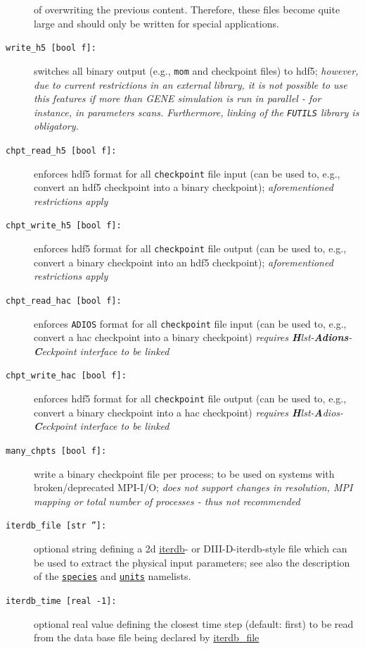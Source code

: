 \documentclass[12pt]{article}
\begin{document}
\begin{description}
of overwriting the previous content. Therefore, these files become quite large and should only be 
written for special applications.
\item[\texttt{write\_h5 [bool f]:}] switches all binary output (e.g., {\tt mom} and checkpoint files) 
to hdf5; {\em however, due to current restrictions in an external library, it is not possible to use this features 
if more than GENE simulation is run in parallel - for instance, in parameters scans. Furthermore, 
linking of the {\tt FUTILS} library is obligatory.}
\item[\texttt{chpt\_read\_h5 [bool f]:}] enforces hdf5 format for all {\tt checkpoint} file input 
(can be used to, e.g., convert an hdf5 checkpoint into a binary checkpoint); 
{\em aforementioned restrictions apply}
\item[\texttt{chpt\_write\_h5 [bool f]:}] enforces hdf5 format for all {\tt checkpoint} file output 
(can be used to, e.g., convert a binary checkpoint into an hdf5 checkpoint);
{\em aforementioned restrictions apply}
\item[\texttt{chpt\_read\_hac [bool f]:}] enforces {\tt ADIOS} format for all {\tt checkpoint} file input 
(can be used to, e.g., convert a hac checkpoint into a binary checkpoint)
{\em requires {\bf H}lst-{\bf Adions}-{\bf C}eckpoint interface to be linked}
\item[\texttt{chpt\_write\_hac [bool f]:}] enforces hdf5 format for all {\tt checkpoint} file output 
(can be used to, e.g., convert a binary checkpoint into a hac checkpoint)
{\em requires {\bf H}lst-{\bf A}dios-{\bf C}eckpoint interface to be linked}
\item[\texttt{many\_chpts [bool f]:}] write a binary checkpoint file per process; to be used 
on systems with broken/deprecated MPI-I/O; {\em does not support changes in resolution, MPI mapping or 
total number of processes - thus not recommended}
\item[\hypertarget{iterdb_file}{\tt iterdb\_file [str '']:}] optional string defining a 2d 
\href{http://tokamak-profiledb.ccfe.ac.uk/}{iterdb}- or DIII-D-iterdb-style file 
which can be used to extract the physical input parameters; 
see also the description of the \hyperlink{species_nml}{\tt species} and 
\hyperlink{units_nml}{\tt units} namelists.
\item[\texttt{iterdb\_time [real -1]:}] optional real value defining the closest time step (default: first) 
to be read from the data base file being declared by \hyperlink{iterdb_file}{iterdb\_file}
\end{description}
\end{document}
